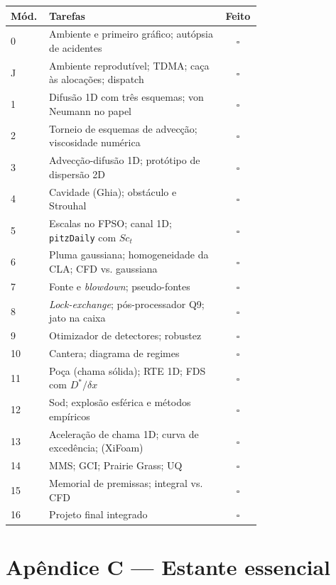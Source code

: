 \documentclass[10pt,a4paper,twocolumn,openany]{report}
\begin{document}
\begin{center}
\small
\begin{tabular}{@{}lp{0.70\linewidth}c@{}}
\toprule
Mód. & Tarefas & Feito\\
\midrule
0  & Ambiente e primeiro gráfico; autópsia de acidentes & $\square$\\
J  & Ambiente reprodutível; TDMA; caça às alocações; dispatch & $\square$\\
1  & Difusão 1D com três esquemas; von Neumann no papel & $\square$\\
2  & Torneio de esquemas de advecção; viscosidade numérica & $\square$\\
3  & Advecção-difusão 1D; protótipo de dispersão 2D & $\square$\\
4  & Cavidade (Ghia); obstáculo e Strouhal & $\square$\\
5  & Escalas no FPSO; canal 1D; \texttt{pitzDaily} com $Sc_t$ & $\square$\\
6  & Pluma gaussiana; homogeneidade da CLA; CFD vs. gaussiana & $\square$\\
7  & Fonte e \emph{blowdown}; pseudo-fontes & $\square$\\
8  & \emph{Lock-exchange}; pós-processador Q9; jato na caixa & $\square$\\
9  & Otimizador de detectores; robustez & $\square$\\
10 & Cantera; diagrama de regimes & $\square$\\
11 & Poça (chama sólida); RTE 1D; FDS com $D^*/\delta x$ & $\square$\\
12 & Sod; explosão esférica e métodos empíricos & $\square$\\
13 & Aceleração de chama 1D; curva de excedência; (XiFoam) & $\square$\\
14 & MMS; GCI; Prairie Grass; UQ & $\square$\\
15 & Memorial de premissas; integral vs. CFD & $\square$\\
16 & Projeto final integrado & $\square$\\
\bottomrule
\end{tabular}
\end{center}

\chapter*{Apêndice C --- Estante essencial}
\end{document}
